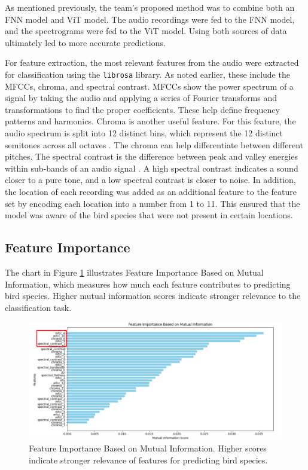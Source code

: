\documentclass[12pt, conference]{IEEEtran}
\begin{document}
As mentioned previously, the team's proposed method was to combine both an FNN model and ViT model. The audio recordings were fed to the FNN model, and the spectrograms were fed to the ViT model. Using both sources of data ultimately led to more accurate predictions.

For feature extraction, the most relevant features from the audio were extracted for classification using the \texttt{librosa} library. As noted earlier, these include the MFCCs, chroma, and spectral contrast. MFCCs show the power spectrum of a signal by taking the audio and applying a series of Fourier transforms and transformations to find the proper coefficients. These help define frequency patterns and harmonics. Chroma is another useful feature. For this feature, the audio spectrum is split into 12 distinct bins, which represent the 12 distinct semitones across all octaves \cite{chromafeatures}. The chroma can help differentiate between different pitches. The spectral contrast is the difference between peak and valley energies within sub-bands of an audio signal \cite{librosa}. A high spectral contrast indicates a sound closer to a pure tone, and a low spectral contrast is closer to noise. In addition, the location of each recording was added as an additional feature to the feature set by encoding each location into a number from 1 to 11. This ensured that the model was aware of the bird species that were not present in certain locations.

\subsection{Feature Importance}

The chart in Figure \ref{fig:feature_importance} illustrates Feature Importance Based on Mutual Information, which measures how much each feature contributes to predicting bird species. Higher mutual information scores indicate stronger relevance to the classification task.

\begin{figure}[h!]
    \centering
    \includegraphics[width=\linewidth]{figures/feature_importance.png}
    \caption{Feature Importance Based on Mutual Information. Higher scores indicate stronger relevance of features for predicting bird species.}
    \label{fig:feature_importance}
\end{figure}
\end{document}
